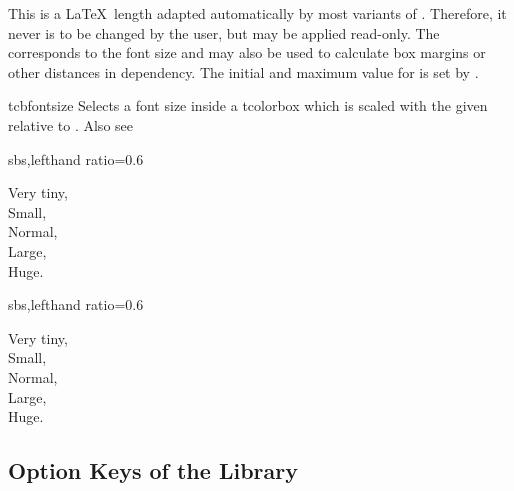 \clearpage

\begin{docCommands}[
    doc name        = tcbfitdim,
    doc description = {read-only \LaTeX\ length},
    doc updated     = 2020-04-24,
  ]{}
  This is a \LaTeX\ length adapted automatically by most variants of
  . Therefore, it never is to be
  changed by the user, but may be applied read-only.
  The  corresponds to the font size and may also
  be used to calculate box margins or other distances in dependency.
  The initial and maximum value for  is set by
  .
\end{docCommands}


\begin{docCommand}{tcbfontsize}{}
  Selects a font size inside a tcolorbox which is scaled with the given
   relative to .
  Also see 

\begin{dispExample*}{sbs,lefthand ratio=0.6}
\begin{tcolorbox}[fit basedim=10pt]
  { Very tiny,}\\
  { Small,}\\
  { Normal,}\\
  { Large,}\\
  { Huge.}
\end{tcolorbox}
\end{dispExample*}
\begin{dispExample*}{sbs,lefthand ratio=0.6}
\begin{tcolorbox}[fit basedim=10pt,
    fit to height=2cm]
  { Very tiny,}\\
  { Small,}\\
  { Normal,}\\
  { Large,}\\
  { Huge.}
\end{tcolorbox}
\end{dispExample*}
\end{docCommand}


\clearpage
\subsection{Option Keys of the Library}\label{subsec:fit}


